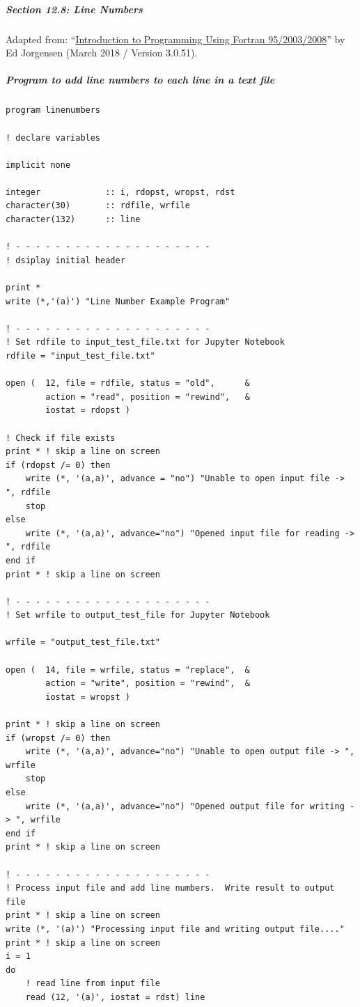 \subparagraph{Section 12.8: Line Numbers}

Adapted from: ``\href{https://open.umn.edu/opentextbooks/textbooks/introduction-to-programming-using-fortran-95-2003-2008}{Introduction to Programming Using Fortran 95/2003/2008}'' by Ed Jorgensen (March 2018 / Version 3.0.51).

\subparagraph{Program to add line numbers to each line in a text file}

\begin{verbatim}
program linenumbers

! declare variables

implicit none

integer             :: i, rdopst, wropst, rdst
character(30)       :: rdfile, wrfile
character(132)      :: line

! - - - - - - - - - - - - - - - - - - - -
! dsiplay initial header

print *
write (*,'(a)') "Line Number Example Program"

! - - - - - - - - - - - - - - - - - - - -
! Set rdfile to input_test_file.txt for Jupyter Notebook
rdfile = "input_test_file.txt"

open (  12, file = rdfile, status = "old",      &
        action = "read", position = "rewind",   &
        iostat = rdopst )

! Check if file exists
print * ! skip a line on screen
if (rdopst /= 0) then
    write (*, '(a,a)', advance = "no") "Unable to open input file -> ", rdfile
    stop
else
    write (*, '(a,a)', advance="no") "Opened input file for reading -> ", rdfile
end if
print * ! skip a line on screen

! - - - - - - - - - - - - - - - - - - - -
! Set wrfile to output_test_file for Jupyter Notebook

wrfile = "output_test_file.txt"

open (  14, file = wrfile, status = "replace",  &
        action = "write", position = "rewind",  &
        iostat = wropst )

print * ! skip a line on screen
if (wropst /= 0) then
    write (*, '(a,a)', advance="no") "Unable to open output file -> ", wrfile
    stop
else 
    write (*, '(a,a)', advance="no") "Opened output file for writing -> ", wrfile
end if
print * ! skip a line on screen

! - - - - - - - - - - - - - - - - - - - -
! Process input file and add line numbers.  Write result to output file
print * ! skip a line on screen
write (*, '(a)') "Processing input file and writing output file...."
print * ! skip a line on screen
i = 1
do
    ! read line from input file
    read (12, '(a)', iostat = rdst) line


\end{verbatim}
